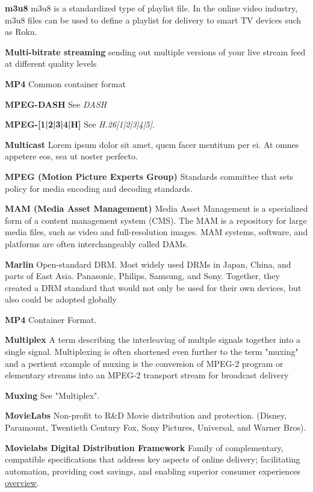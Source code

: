\smallskip
\textbf{m3u8}
m3u8 is a standardized type of playlist file. In the online video industry, m3u8 files can be used to define a playlist for delivery to smart TV devices such as Roku.

\smallskip
\textbf{Multi-bitrate streaming}
sending out multiple versions of your live stream feed at different quality levels

\smallskip
\textbf{MP4}
Common container format

\smallskip
\textbf{MPEG-DASH}
See \textit{DASH}

\smallskip
\textbf{MPEG-[1|2|3|4|H]}
See \textit{H.26[1|2|3|4|5]}.

\smallskip
\textbf{Multicast}
Lorem ipsum dolor sit amet, quem facer mentitum per ei. At omnes appetere eos, sea ut noster perfecto.

\smallskip
\textbf{MPEG (Motion Picture Experts Group)}
Standards committee that sets policy for media encoding and decoding standards.

\smallskip
\textbf{MAM (Media Asset Management)}
Media Asset Management is a specialized form of a content management system (CMS). The MAM is a repository for large media files, such as video and full-resolution images. MAM systems, software, and platforms are often interchangeably called DAMs.

\smallskip
\textbf{Marlin}
Open-standard DRM. Most widely used DRMs in Japan, China, and parts of East Asia. Panasonic, Philips, Samsung, and Sony. Together, they created a DRM standard that would not only be used for their own devices, but also could be adopted globally

\smallskip
\textbf{MP4}
Container Format.

\smallskip
\textbf{Multiplex}
A term describing the interleaving of multple signals together into a single signal. Multiplexing is often shortened even further to the term "muxing" and a pertient example of muxing is the conversion of MPEG-2 program or elementary streams into an MPEG-2 transport stream for broadcast delivery

\smallskip
\textbf{Muxing}
See "Multiplex".

\smallskip
\textbf{MovieLabs}
Non-profit to R\&D Movie distribution and protection. (Disney, Paramount, Twentieth Century Fox, Sony Pictures, Universal, and Warner Bros).

\smallskip
\textbf{Movielabs Digital Distribution Framework}
Family of complementary, compatible specifications that address key aspects of online delivery; facilitating automation, providing cost savings, and enabling superior consumer experiences \href{https://movielabs.com/md/}{overview}.

